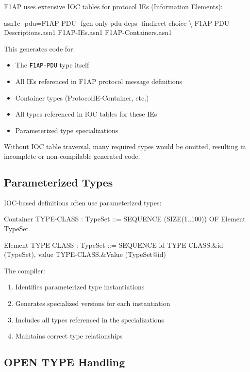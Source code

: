 \documentclass[english,oneside,12pt]{book}
\begin{document}
F1AP uses extensive IOC tables for protocol IEs (Information Elements):

\begin{bash}
asn1c -pdu=F1AP-PDU -fgen-only-pdu-deps -findirect-choice \textbackslash
      F1AP-PDU-Descriptions.asn1 F1AP-IEs.asn1 F1AP-Containers.asn1
\end{bash}

This generates code for:
\begin{itemize}
\item The \texttt{F1AP-PDU} type itself
\item All IEs referenced in F1AP protocol message definitions
\item Container types (ProtocolIE-Container, etc.)
\item All types referenced in IOC tables for these IEs
\item Parameterized type specializations
\end{itemize}

Without IOC table traversal, many required types would be omitted, resulting in 
incomplete or non-compilable generated code.

\subsection*{Parameterized Types}

IOC-based definitions often use parameterized types:

\begin{asn}
Container { TYPE-CLASS : TypeSet } ::= SEQUENCE (SIZE(1..100)) OF
    Element { {TypeSet} }

Element { TYPE-CLASS : TypeSet } ::= SEQUENCE {
    id      TYPE-CLASS.&id      ({TypeSet}),
    value   TYPE-CLASS.&Value   ({TypeSet}{@id})
}
\end{asn}

The compiler:
\begin{enumerate}
\item Identifies parameterized type instantiations
\item Generates specialized versions for each instantiation
\item Includes all types referenced in the specializations
\item Maintains correct type relationships
\end{enumerate}

\subsection*{OPEN TYPE Handling}
\end{document}
